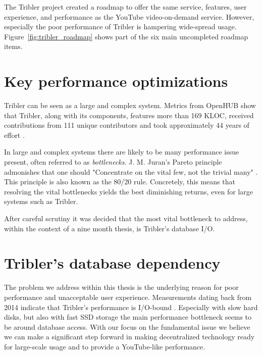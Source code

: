 The Tribler project created a roadmap to offer the same service, features, user experience, and performance as the YouTube video-on-demand service.
However, especially the poor performance of Tribler is hampering wide-spread usage. Figure~\ref{fig:tribler_roadmap} shows part of the six main uncompleted roadmap items.

\section{Key performance optimizations}

Tribler can be seen as a large and complex system.
Metrics from OpenHUB show that Tribler, along with its components, features more than 169 KLOC, received contributions from 111 unique contributors and took approximately 44 years of effort \cite{openhub2016tribler}.

In large and complex systems there are likely to be many performance issue present, often referred to as \emph{bottlenecks}.
J. M. Juran's Pareto principle admonishes that one should "Concentrate on the vital few, not the trivial many" \cite{ammons2004finding}. This principle is also known as the 80/20 rule.
Concretely, this means that resolving the vital bottlenecks yields the best diminishing returns, even for large systems such as Tribler.

After careful scrutiny it was decided that the most vital bottleneck to address, within the context of a nine month thesis, is Tribler's database I/O.

\section{Tribler's database dependency}

The problem we address within this thesis is the underlying reason for poor performance and unacceptable user experience. 
Measurements dating back from 2014 indicate that Tribler's performance is I/O-bound \cite{pouwelse2014reduce}.
Especially with slow hard disks, but also with fast SSD storage the main performance bottleneck seems to be around database access.
With our focus on the fundamental issue we believe we can make a significant step forward in making decentralized technology ready for large-scale usage and to provide a YouTube-like performance. 

